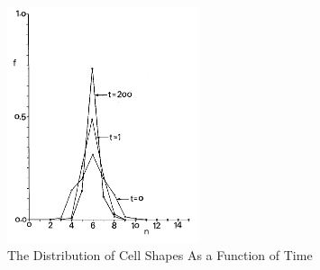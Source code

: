 \begin{figure}
\includegraphics[width=0.5\textwidth]{../diagrams/distibutionHonda.png}
\caption{The Distribution of Cell Shapes As a Function of Time \cite{HondaNagai}}
\end{figure}
